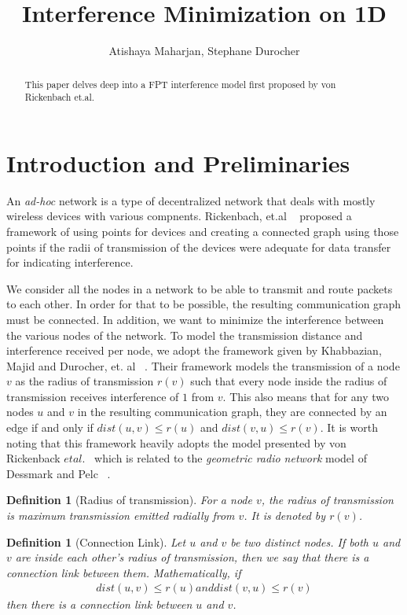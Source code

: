 \documentclass{article}
\title{Interference Minimization on 1D}
\author{Atishaya Maharjan, Stephane Durocher}
\newtheorem{definition}[theorem]{Definition}
\begin{document}
\maketitle

\begin{abstract}
	This paper delves deep into a FPT interference model first proposed by von Rickenbach et.al.
\end{abstract}

\section{Introduction and Preliminaries}

An \textit{ad-hoc} network is a type of decentralized network that deals with mostly wireless devices with various compnents. Rickenbach, et.al ~\cite{1420165} proposed a framework of using points for devices and creating a connected graph using those points if the radii of transmission of the devices were adequate for data transfer for indicating interference.

We consider all the nodes in a network to be able to transmit and route packets to each other. In order for that to be possible, the resulting communication graph must be connected. In addition, we want to minimize the interference between the various nodes of the network. To model the transmission distance and interference received per node, we adopt the framework given by  Khabbazian, Majid and Durocher, et. al ~\cite{6809218}. Their framework models the transmission of a node $v$ as the radius of transmission $r(v)$ such that every node inside the radius of transmission receives interference of $1$ from $v$. This also means that for any two nodes $u$ and $v$ in the resulting communication graph, they are connected by an edge if and only if $dist(u, v) \leq r(u)$ and $dist(v, u) \leq r(v)$. It is worth noting that this framework heavily adopts the model presented by von Rickenback $et al.$~\cite{1420165} which is related to the \textit{geometric radio network} model of Dessmark and Pelc ~\cite{DessmarkAnders2001Tbka}.

\begin{definition}[Radius of transmission]
	For a node $v$, the radius of transmission is maximum transmission emitted radially from $v$. It is denoted by $r(v)$.
\end{definition}

\begin{definition}[Connection Link]
	Let $u$ and $v$ be two distinct nodes. If both $u$ and $v$ are inside each other's radius of transmission, then we say that there is a connection link between them. Mathematically, if
	\begin{align*}
		dist(u,v) \leq r(u) and dist(v, u) \leq r(v)
	\end{align*}
	then there is a connection link between $u$ and $v$.
\end{definition}
\end{document}
